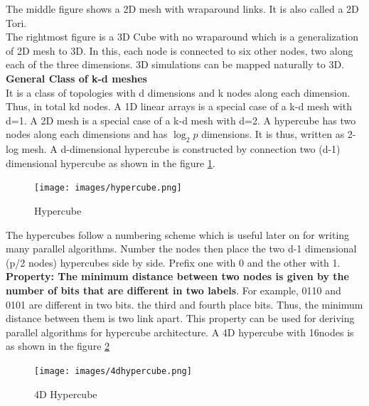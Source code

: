 \documentclass[12pt]{article}
\begin{document}
The middle figure shows a 2D mesh with wraparound links. It is also called a 2D Tori.\\
The rightmost figure is a 3D Cube with no wraparound which is a generalization of 2D mesh to 3D. In this, each node is connected to six other nodes, 
two along each of the three dimensions. 3D simulations can be mapped naturally to 3D.\\
\textbf{General Class of k-d meshes}\\
It is a class of topologies with d dimensions and k nodes along each dimension. Thus, in total kd nodes.
A 1D linear arrays is a special case of a k-d mesh with d=1. A 2D mesh is a special case of a k-d mesh with d=2.
A hypercube has two nodes along each dimensions and has $\log_2 p$ dimensions. It is thus, written as 2-log mesh.
A d-dimensional hypercube is constructed by connection two (d-1) dimensional hypercube as shown in the figure \ref{fig:hypercube}.
\begin{figure}[H]
    \centering
    \texttt{[image: images/hypercube.png]}
    \caption{Hypercube}
    \label{fig:hypercube}
\end{figure}
The hypercubes follow a numbering scheme which is useful later on for writing many parallel algorithms. 
Number the nodes then place the two d-1 dimensional (p/2 nodes) hypercubes side by side. Prefix one with 0 and the other with 1.
\textbf{Property: The minimum distance between two nodes is given by the number of bits that are different in two labels}. For example,
0110 and 0101 are different in two bits. the third and fourth place bits. Thus, the minimum distance between them is two link apart. This property can 
be used for deriving parallel algorithms for hypercube architecture.
A 4D hypercube with 16nodes is as shown in the figure \ref{fig:4dhypercube}
\begin{figure}[H]
    \centering
    \texttt{[image: images/4dhypercube.png]}
    \caption{4D Hypercube}
    \label{fig:4dhypercube}
\end{figure}
\end{document}

